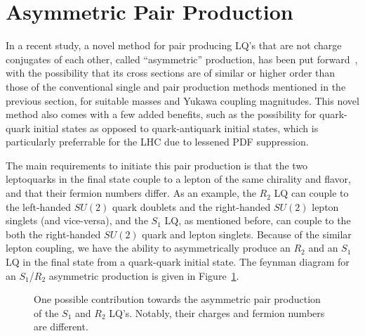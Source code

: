 \section{Asymmetric Pair Production}
        In a recent study, a novel method for pair producing LQ's that are not charge conjugates of each other, called ``asymmetric'' production, has been put forward~\cite{Dorsner_2023}, with the possibility that its cross sections are of similar or higher order than those of the conventional single and pair production methods mentioned in the previous section, for suitable masses and Yukawa coupling magnitudes. This novel method also comes with a few added benefits, such as the possibility for quark-quark initial states as opposed to quark-antiquark initial states, which is particularly preferrable for the LHC due to lessened PDF suppression.

        The main requirements to initiate this pair production is that the two leptoquarks in the final state couple to a lepton of the same chirality and flavor, and that their fermion numbers differ. As an example, the $R_2$ LQ can couple to the left-handed $SU(2)$ quark doublets and the right-handed $SU(2)$ lepton singlets (and vice-versa), and the $S_1$ LQ, as mentioned before, can couple to the both the right-handed $SU(2)$ quark and lepton singlets. Because of the similar lepton coupling, we have the ability to asymmetrically produce an $R_2$ and an $S_1$ LQ in the final state from a quark-quark initial state. The feynman diagram for an $S_1$/$R_2$ asymmetric production is given in Figure~\ref{s1r2FeynmanDiagram}.

        \begin{figure}[t]
            \centering
            

            \caption{One possible contribution towards the asymmetric pair production of the $S_1$ and $R_2$ LQ's. Notably, their charges and fermion numbers are different.}
            \label{s1r2FeynmanDiagram}
        \end{figure}

